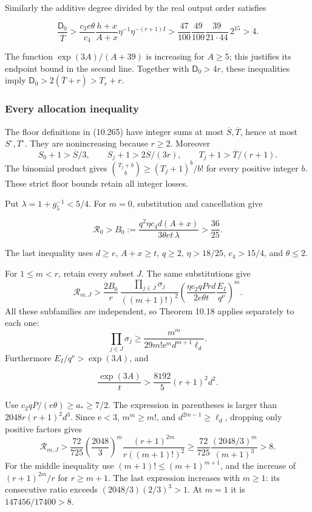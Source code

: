 \documentclass[
  11pt,
  a4paper,
]{article}
\begin{document}
Similarly the additive degree divided by the real output order satisfies

\[
\frac{\mathsf D_0}{\overline T}
>\frac{c_3e\theta}{c_4}\frac{h+x}{A+x}
\eta^{-1}\eta^{-(r+1)I}
>\frac{47}{100}\frac{49}{100}\frac{39}{21\cdot44}\,2^{15}>4.
\]

The function \(\exp(3A)/(A+39)\) is increasing for \(A\ge5\); this
justifies its endpoint bound in the second line. Together with
\(\mathsf D_0>4r\), these inequalities imply
\(\mathsf D_0>2(\overline T+r)>T_r+r\).

\subsubsection{Every allocation
inequality}\label{every-allocation-inequality}

The floor definitions in (10.265) have integer sums at most
\(\overline S,\overline T\), hence at most \(S^\circ,T^\circ\). They are
nonincreasing because \(r\ge2\). Moreover \[
S_0+1>\overline S/3,\qquad
S_j+1>2\overline S/(3r),\qquad
T_j+1>\overline T/(r+1).
\] The binomial product gives \(\binom{T_j+b}{b}\ge(T_j+1)^b/b!\) for
every positive integer \(b\). These strict floor bounds retain all
integer losses.

Put \(\lambda=1+g_5^{-1}<5/4\). For \(m=0\), substitution and
cancellation give

\[
\mathcal R_0>
B_0:=\frac{q^2\eta c_4d(A+x)}{3\theta et\,\lambda}
>\frac{36}{25}.
\]

The last inequality uses \(d\ge e\), \(A+x\ge t\), \(q\ge2\),
\(\eta>18/25\), \(c_4>15/4\), and \(\theta\le2\).

For \(1\le m<r\), retain every subset \(J\). The same substitutions give
\[
\mathcal R_{m,J}>
\frac{2B_0}{r}\,
\frac{\prod_{j\in J}\sigma_j}{((m+1)!)^2}
\left(\frac{\eta c_2qPrd}{2e\theta t}
\frac{E_I}{q^\nu}\right)^m.
\] All these subfamilies are independent, so Theorem 10.18 applies
separately to each one: \[
\prod_{j\in J}\sigma_j
\ge\frac{m^m}{29m!\mathrm e^m d^{m+1}\ell_d}.
\] Furthermore \(E_I/q^\nu>\exp(3A)\), and

\[
\frac{\exp(3A)}t
>\frac{8192}{5}(r+1)^2d^2.
\]

Use \(c_2qP/(e\theta)\ge a_*\ge7/2\). The expression in parentheses is
larger than \(2048r(r+1)^2d^3\). Since \(\mathrm e<3\), \(m^m\ge m!\),
and \(d^{2m-1}\ge\ell_d\), dropping only positive factors gives \[
\mathcal R_{m,J}>
\frac{72}{725}\left(\frac{2048}{3}\right)^m
\frac{(r+1)^{2m}}{r((m+1)!)^2}
\ge\frac{72}{725}\frac{(2048/3)^m}{(m+1)^3}>8.
\] For the middle inequality use \((m+1)!\le(m+1)^{m+1}\), and the
increase of \((r+1)^{2m}/r\) for \(r\ge m+1\). The last expression
increases with \(m\ge1\): its consecutive ratio exceeds
\((2048/3)(2/3)^3>1\). At \(m=1\) it is \(147456/17400>8\).
\end{document}
